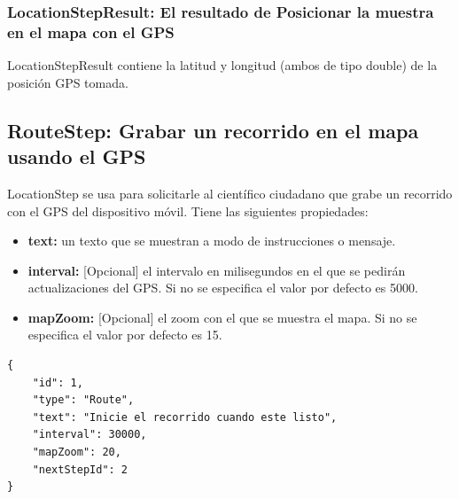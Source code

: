 \subsubsection{LocationStepResult: El resultado de Posicionar la muestra en el mapa con el GPS}
LocationStepResult contiene la latitud y longitud (ambos de tipo double) de la posición GPS tomada.





\subsection{RouteStep: Grabar un recorrido en el mapa usando el GPS}
LocationStep se usa para solicitarle al científico ciudadano que grabe un recorrido con el GPS del dispositivo móvil. Tiene las siguientes propiedades:

\begin{itemize}
\item \textbf{text:} un texto que se muestran a modo de instrucciones o mensaje.
\item \textbf{interval:} [Opcional] el intervalo en milisegundos en el que se pedirán actualizaciones del GPS. Si no se especifica el valor por defecto es 5000.
\item \textbf{mapZoom:} [Opcional] el zoom con el que se muestra el mapa. Si no se especifica el valor por defecto es 15.
\end{itemize}

\begin{lstlisting}[language=XML, frame=tlbr, caption=RouteStep usando el generador de clases.]	
{
	"id": 1,
	"type": "Route",
	"text": "Inicie el recorrido cuando este listo",
	"interval": 30000,
	"mapZoom": 20,
	"nextStepId": 2
}
\end{lstlisting}


